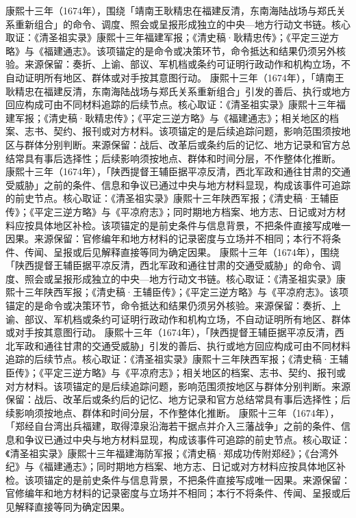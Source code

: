 康熙十三年（1674年），围绕「靖南王耿精忠在福建反清，东南海陆战场与郑氏关系重新组合」的命令、调度、照会或呈报形成独立的中央—地方行动文书链。核心取证：《清圣祖实录》康熙十三年福建军报；《清史稿·耿精忠传》；《平定三逆方略》与《福建通志》。该项锚定的是命令或决策环节，命令抵达和结果仍须另外核验。来源保留：奏折、上谕、部议、军机档或条约可证明行政动作和机构立场，不自动证明所有地区、群体或对手按其意图行动。
康熙十三年（1674年），「靖南王耿精忠在福建反清，东南海陆战场与郑氏关系重新组合」引发的善后、执行或地方回应构成可由不同材料追踪的后续节点。核心取证：《清圣祖实录》康熙十三年福建军报；《清史稿·耿精忠传》；《平定三逆方略》与《福建通志》；相关地区的档案、志书、契约、报刊或对方材料。该项锚定的是后续追踪问题，影响范围须按地区与群体分别判断。来源保留：战后、改革后或条约后的记忆、地方记录和官方总结常具有事后选择性；后续影响须按地点、群体和时间分层，不作整体化推断。
康熙十三年（1674年），「陕西提督王辅臣据平凉反清，西北军政和通往甘肃的交通受威胁」之前的条件、信息和争议已通过中央与地方材料显现，构成该事件可追踪的前史节点。核心取证：《清圣祖实录》康熙十三年陕西军报；《清史稿·王辅臣传》；《平定三逆方略》与《平凉府志》；同时期地方档案、地方志、日记或对方材料应按具体地区补检。该项锚定的是前史条件与信息背景，不把条件直接写成唯一因果。来源保留：官修编年和地方材料的记录密度与立场并不相同；本行不将条件、传闻、呈报或后见解释直接等同为确定因果。
康熙十三年（1674年），围绕「陕西提督王辅臣据平凉反清，西北军政和通往甘肃的交通受威胁」的命令、调度、照会或呈报形成独立的中央—地方行动文书链。核心取证：《清圣祖实录》康熙十三年陕西军报；《清史稿·王辅臣传》；《平定三逆方略》与《平凉府志》。该项锚定的是命令或决策环节，命令抵达和结果仍须另外核验。来源保留：奏折、上谕、部议、军机档或条约可证明行政动作和机构立场，不自动证明所有地区、群体或对手按其意图行动。
康熙十三年（1674年），「陕西提督王辅臣据平凉反清，西北军政和通往甘肃的交通受威胁」引发的善后、执行或地方回应构成可由不同材料追踪的后续节点。核心取证：《清圣祖实录》康熙十三年陕西军报；《清史稿·王辅臣传》；《平定三逆方略》与《平凉府志》；相关地区的档案、志书、契约、报刊或对方材料。该项锚定的是后续追踪问题，影响范围须按地区与群体分别判断。来源保留：战后、改革后或条约后的记忆、地方记录和官方总结常具有事后选择性；后续影响须按地点、群体和时间分层，不作整体化推断。
康熙十三年（1674年），「郑经自台湾出兵福建，取得漳泉沿海若干据点并介入三藩战争」之前的条件、信息和争议已通过中央与地方材料显现，构成该事件可追踪的前史节点。核心取证：《清圣祖实录》康熙十三年福建海防军报；《清史稿·郑成功传附郑经》；《台湾外纪》与《福建通志》；同时期地方档案、地方志、日记或对方材料应按具体地区补检。该项锚定的是前史条件与信息背景，不把条件直接写成唯一因果。来源保留：官修编年和地方材料的记录密度与立场并不相同；本行不将条件、传闻、呈报或后见解释直接等同为确定因果。
